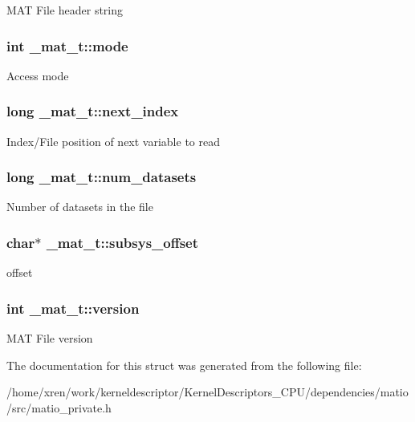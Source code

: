 \label{struct__mat__t_a5ed5d0e4e3c4d76b626a8a1772d579c4}
MAT File header string \hypertarget{struct__mat__t_aa43288b63b8edb7cadf0b79e2d1df2ee}{
\subsubsection[{mode}]{\setlength{\rightskip}{0pt plus 5cm}int {\bf \_\-mat\_\-t::mode}}}
\label{struct__mat__t_aa43288b63b8edb7cadf0b79e2d1df2ee}
Access mode \hypertarget{struct__mat__t_ab673fe0b330cf4666a66924e37d908d8}{
\subsubsection[{next\_\-index}]{\setlength{\rightskip}{0pt plus 5cm}long {\bf \_\-mat\_\-t::next\_\-index}}}
\label{struct__mat__t_ab673fe0b330cf4666a66924e37d908d8}
Index/File position of next variable to read \hypertarget{struct__mat__t_afa714cbc14c9846e8e62df7cae0a9181}{
\subsubsection[{num\_\-datasets}]{\setlength{\rightskip}{0pt plus 5cm}long {\bf \_\-mat\_\-t::num\_\-datasets}}}
\label{struct__mat__t_afa714cbc14c9846e8e62df7cae0a9181}
Number of datasets in the file \hypertarget{struct__mat__t_a19317c01209959d755d69311960d3eec}{
\subsubsection[{subsys\_\-offset}]{\setlength{\rightskip}{0pt plus 5cm}char$\ast$ {\bf \_\-mat\_\-t::subsys\_\-offset}}}
\label{struct__mat__t_a19317c01209959d755d69311960d3eec}
offset \hypertarget{struct__mat__t_a729c2bc0afc97485057a5af425635b1a}{
\subsubsection[{version}]{\setlength{\rightskip}{0pt plus 5cm}int {\bf \_\-mat\_\-t::version}}}
\label{struct__mat__t_a729c2bc0afc97485057a5af425635b1a}
MAT File version 

The documentation for this struct was generated from the following file:\begin{DoxyCompactItemize}
\item 
/home/xren/work/kerneldescriptor/KernelDescriptors\_\-CPU/dependencies/matio/src/matio\_\-private.h\end{DoxyCompactItemize}
